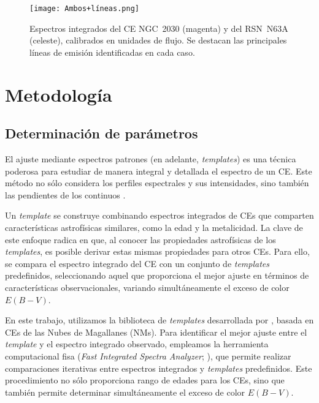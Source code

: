 \documentclass[baaa]{baaa}
\begin{document}
\begin{figure*}[!ht]
\centering
\texttt{[image: Ambos+líneas.png]}  %
\caption{Espectros integrados del CE NGC~2030 (magenta) y del RSN~N63A (celeste), calibrados en unidades de flujo. Se destacan las principales líneas de emisión identificadas en cada caso.
}
\label{F2}
\end{figure*}


\section{Metodología}

\subsection{Determinación de parámetros}

El ajuste mediante espectros patrones (en adelante, \textit{templates}) es una técnica poderosa para estudiar de manera integral y detallada el espectro de un CE. 
Este método no sólo considera los perfiles espectrales y sus intensidades, sino también las pendientes de los continuos \citep{Ahumada+2019}.

Un \textit{template} %
se construye combinando espectros integrados de CEs que comparten características astrofísicas similares, como la edad y la  metalicidad.
La clave de este enfoque radica en que, al conocer las propiedades astrofísicas de los \textit{templates}, es posible derivar estas mismas propiedades para otros CEs. Para ello, se compara el espectro
integrado del CE con un conjunto de \textit{templates} predefinidos, seleccionando aquel que proporciona el mejor ajuste en términos de características observacionales, variando simultáneamente el exceso de color \(E(B-V)\).

En este trabajo, utilizamos la biblioteca de \textit{templates} desarrollada por \citet{Santos+1995}, basada en CEs de las Nubes de Magallanes (NMs). Para identificar el mejor ajuste entre el \textit{template} y el espectro integrado observado, empleamos la 
herramienta computacional {\sc fisa } (\textit{Fast Integrated Spectra Analyzer};   \citealt{Benitez-Lambay}), que permite realizar comparaciones iterativas entre espectros integrados y \textit{templates} predefinidos.
Este procedimiento no sólo proporciona rango de edades para los CEs, sino que también permite determinar simultáneamente el exceso de color \(E(B-V)\).
\end{document}
